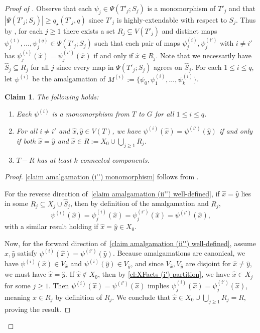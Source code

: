\documentclass[12pt,letterpaper]{article}
\newtheorem{claim}[theorem]{Claim}
\theoremstyle{definition}
\newcommand{\pow}{q} %
\newcommand{\Pow}{{q_\star}} %
\newcommand{\sub}{\subseteq}
\begin{document}
\begin{proof}[Proof of ]
		Observe that each $\psi_j\in \Psi(T'_j;S_j)$ is a monomorphism of $T'_j$ and that $|\Psi(T'_j;S_j)|\ge \Pow(T'_j,q)$ since $T'_j$ is highly-extendable with respect to $S_j$.  Thus by , for each $j\ge 1$ there exists a set $R_j\subsetneq V(T'_j)$ and distinct maps $\psi_j^{(1)},\ldots,\psi_j^{(\pow)}\in \Psi(T'_j;S_j)$ such that each pair of maps $\psi_j^{(i)},\psi_j^{(i')}$ with $i\ne i'$ has $\psi_j^{(i)}(\hat{x})=\psi_j^{(i')}(\hat{x})$ if and only if $\hat{x}\in R_j$.  Note that we necessarily have $\widehat{S}_j\sub R_j$ for all $j$ since every map in $\Psi(T'_j;S_j)$ agrees on $\widehat{S}_j$.  For each $1\le i\le \pow$, let $\psi^{(i)}$ be the amalgamation of $M^{(i)}:=\{\psi_0,\psi_1^{(i)},\ldots,\psi_k^{(i)}\}$. 
		\begin{claim}\label{claim amalgamation}
			The following holds:
			\begin{enumerate}[label=(\roman*'')]
				\item Each $\psi^{(i)}$ is a monomorphism from $T$ to $G$ for all $1\le i\le \pow$.\label{claim amalgamation (i'') monomorphism}
				\item For all $i\ne i'$ and $\hat{x},\hat{y}\in V(T)$, we have $\psi^{(i)}(\hat{x})=\psi^{(i')}(\hat{y})$ if and only if both $\hat{x}=\hat{y}$ and $\hat{x}\in R:=X_0\cup \bigcup_{j\ge 1} R_j$.\label{claim amalgamation (ii'') well-defined}
				\item $T-R$ has at least $k$ connected components.\label{claim amalgamation (iii'') T-R has k components}
			\end{enumerate}
		\end{claim}
		\begin{proof}
			\ref{claim amalgamation (i'') monomorphism} follows from .
			
			For the reverse direction of~\ref{claim amalgamation (ii'') well-defined}, if $\hat{x}=\hat{y}$ lies in some $R_j\sub X_j\cup \widehat{S}_j$, then by definition of the amalgamation and $R_j$,  \[\psi^{(i)}(\hat{x})=\psi_j^{(i)}(\hat{x})=\psi_j^{(i')}(\hat{x})=\psi^{(i')}(\hat{x}),\] with a similar result holding if $\hat{x}=\hat{y}\in X_0$.  
			
			Now, for the forward direction of~\ref{claim amalgamation (ii'') well-defined}, assume $\hat{x},\hat{y}$ satisfy $\psi^{(i)}(\hat{x})=\psi^{(i')}(\hat{y})$.  Because amalgamations are canonical, we have $\psi^{(i)}(\hat{x})\in V_{\hat{x}}$ and $\psi^{(i)}(\hat{y})\in V_{\hat{y}}$, and since $V_{\hat{x}},V_{\hat{y}}$ are disjoint for $\hat{x}\ne \hat{y}$, we must have $\hat{x}=\hat{y}$. If $\hat{x}\notin X_0$, then by \ref{cl:XFacts (i') partition}, we have $\hat{x}\in X_j$ for some $j\ge 1$. Then $\psi^{(i)}(\hat{x})=\psi^{(i')}(\hat{x})$ implies $\psi^{(i)}_j(\hat{x})=\psi^{(i')}_j(\hat{x})$, meaning $\hat{x}\in R_j$ by definition of $R_j$.  We conclude that $\hat{x}\in X_0\cup \bigcup_{j\ge 1} R_j=R$, proving the result.
			

\end{proof}
\end{proof}
\end{document}
